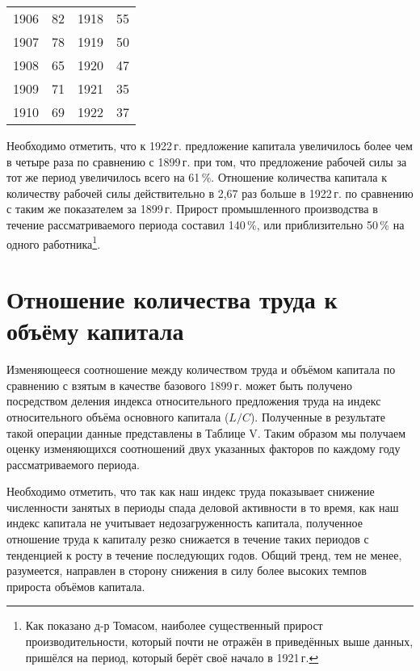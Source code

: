 \documentclass[leqno]{article}  %
\begin{document}
\begin{table}
{\begin{tabular}{p{}|p{}||p{}|p{}}
1906 & \hfill 82 & \hspace*{2.5mm} 1918 & \hfill 55 \hspace*{2.5mm} \\
1907 & \hfill 78 & \hspace*{2.5mm} 1919 & \hfill 50 \hspace*{2.5mm} \\
1908 & \hfill 65 & \hspace*{2.5mm} 1920 & \hfill 47 \hspace*{2.5mm} \\
1909 & \hfill 71 & \hspace*{2.5mm} 1921 & \hfill 35 \hspace*{2.5mm} \\
1910 & \hfill 69 & \hspace*{2.5mm} 1922 & \hfill 37 \hspace*{2.5mm} \\
\hline
\end{tabular}
}
\end{table}

\par
Необходимо отметить, что к 1922\,г. предложение капитала увеличилось более чем в четыре раза по сравнению с 1899\,г. при том, что предложение рабочей силы за тот же период увеличилось всего на 61\,\%. Отношение количества капитала к количеству рабочей силы действительно в 2,67 раз больше в 1922\,г. по сравнению с таким же показателем за 1899\,г. Прирост промышленного производства в течение рассматриваемого периода составил 140\,\%, или приблизительно 50\,\% на одного работника\footnote{Как показано д-р Томасом, наиболее существенный прирост производительности, который почти не отражён в приведённых выше данных, пришёлся на период, который берёт своё начало в 1921\,г.}.
\section{Отношение количества труда к объёму капитала}
Изменяющееся соотношение между количеством труда и объёмом капитала по сравнению с взятым в качестве базового 1899\,г. может быть получено посредством деления индекса относительного предложения труда на индекс относительного объёма основного капитала (\( L / C \)). Полученные в результате такой операции данные представлены в Таблице V. Таким образом мы получаем оценку изменяющихся соотношений двух указанных факторов по каждому году рассматриваемого периода.
\par
Необходимо отметить, что так как наш индекс труда показывает снижение численности занятых в периоды спада деловой активности в то время, как наш индекс капитала не учитывает недозагруженность капитала, полученное отношение труда к капиталу резко снижается в течение таких периодов с тенденцией к росту в течение последующих годов. Общий тренд, тем не менее, разумеется, направлен в сторону снижения в силу более высоких темпов прироста объёмов капитала.
\end{document}
